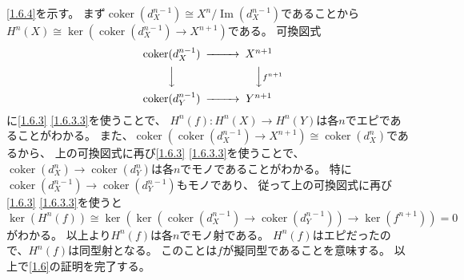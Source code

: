 \documentclass[uplatex,dvipdfmx]{jsarticle}
\makeatletter
\theoremstyle{definition}
\renewenvironment{proof}[1][\proofname]{
  \pushQED{\qed}%
  \normalfont \topsep6\p@\@plus6\p@\relax
  \trivlist
  \item[\hskip\labelsep
    #1\@addpunct{\textbf{.}}]\ignorespaces
}{%
  \popQED\endtrivlist\@endpefalse
}
\providecommand{\proofname}{証明}
\DeclareMathOperator{\im}{\mathrm{Im}}
\DeclareMathOperator{\coker}{\mathrm{coker}}
\makeatother
\begin{document}
\begin{proof}
  \ref{1.6.4}を示す。
  まず\(\coker(d_X^{n-1})\cong X^n/\im(d_X^{n-1})\)であることから
  \(H^n(X) \cong \ker(\coker(d_X^{n-1})\to X^{n+1})\)である。
  可換図式
  \[
  \begin{CD}
    \coker(d_X^{n-1}) @>>> X^{n+1} \\
    @VVV @VV f^{n+1} V \\
    \coker(d_Y^{n-1}) @>>> Y^{n+1}
  \end{CD}
  \]
  に\ref{1.6.3} \ref{1.6.3.3}を使うことで、
  \(H^n(f):H^n(X)\to H^n(Y)\)は各\(n\)でエピであることがわかる。
  また、\(\coker(\coker(d_X^{n-1})\to X^{n+1}) \cong \coker(d_X^n)\)であるから、
  上の可換図式に再び\ref{1.6.3} \ref{1.6.3.3}を使うことで、
  \(\coker(d_X^n)\to \coker(d_Y^n)\)は各\(n\)でモノであることがわかる。
  特に\(\coker(d_X^{n-1})\to \coker(d_Y^{n-1})\)もモノであり、
  従って上の可換図式に再び\ref{1.6.3} \ref{1.6.3.3}を使うと
  \[
  \ker(H^n(f)) \cong
  \ker(\ker(\coker(d_X^{n-1})\to \coker(d_Y^{n-1})) \to \ker(f^{n+1})) = 0
  \]
  がわかる。
  以上より\(H^n(f)\)は各\(n\)でモノ射である。
  \(H^n(f)\)はエピだったので、\(H^n(f)\)は同型射となる。
  このことは\(f\)が擬同型であることを意味する。
  以上で\autoref{1.6}の証明を完了する。
\end{proof}
\end{document}
